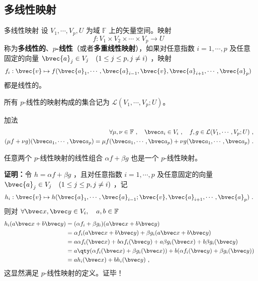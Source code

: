 

\subsection{多线性映射}
\begin{definition}{多线性映射}
设 $V_1,\cdots,V_p, U$ 为域 $\mathbb{F}$ 上的矢量空间。映射
\begin{equation}
f:V_1\times V_2\times\cdots\times V_p\rightarrow U~
\end{equation}
称为\textbf{多线性的}、\textbf{$p$-线性}（或者\textbf{多重线性映射}），如果对任意指数 $i=1,\cdots,p$ 及任意固定的向量 $\bvec{a}_j \in V_j\quad(1 \leq j \leq p,j\neq i)$ ，映射
\begin{equation}
f_i:\bvec{v}\mapsto f(\bvec{a}_1, \cdots, \bvec{a}_{i-1}, \bvec{v},\bvec{a}_{i+1}, \cdots,\bvec{a}_p)~
\end{equation}
都是线性的。
\end{definition}
所有 $p$-线性的映射构成的集合记为 $\mathcal{L}(V_1,\cdots,V_p;U)$。

\begin{definition}{加法}
\begin{equation}
\begin{aligned}
\forall \mu,\nu\in\mathbb{F}~,\quad\bvec a_i\in V_i~,\quad f,g\in \mathcal{L}(V_1,\cdots,V_p;U)~,\\
(\mu f+\nu g)(\bvec a_1,\cdots,\bvec a_p)=\mu f(\bvec a_1,\cdots,\bvec a_p)+\nu g(\bvec a_1,\cdots,\bvec a_p)~.
\end{aligned}
\end{equation}
\end{definition}
\begin{theorem}{}\label{the_MulMap_1}
任意两个 $p$-线性映射的线性组合 $\alpha f+\beta g$ 也是一个 $p$-线性映射。
\end{theorem}
\textbf{证明：}令 $h=\alpha f+\beta g$ ，且对任意指数 $i=1,\cdots,p$ 及任意固定的向量 $\bvec{a}_j \in V_j\quad(1\leq j\leq p,j\neq i)$ ，记
\begin{equation}
h_i:\bvec{v}\mapsto h(\bvec{a}_1,\cdots,\bvec{a}_{i-1};\bvec{v},\bvec{a}_{i+1},\cdots,\bvec{a}_p)~.
\end{equation}
则对 $\forall \bvec x,\bvec y\in V_i,\quad a,b\in\mathbb{F}$
\begin{equation}
\begin{aligned}
h_i(a \bvec x+b\bvec y)&=(\alpha f_i+\beta g_i)(a \bvec x+b\bvec y)\\
&=\alpha f_i(a \bvec x+b\bvec y)+\beta g_i(a \bvec x+b\bvec y)\\
&=a\alpha f_i(\bvec x)+b\alpha f_i(\bvec y)+a\beta g_i(\bvec x)+b\beta g_i(\bvec y)\\
&=a\qty(\alpha f_i(\bvec x)+\beta g_i(\bvec x))+b(\alpha f_i(\bvec y)+\beta g_i(\bvec y))\\
&=ah_i(\bvec x)+bh_i(\bvec y)~,
\end{aligned}
\end{equation}
这显然满足 $p$-线性映射的定义。证毕！


